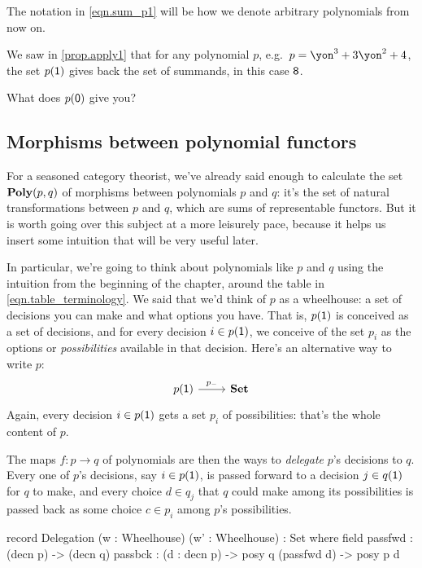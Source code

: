 \documentclass[DynamicalBook]{subfiles}
\begin{document}
The notation in \eqref{eqn.sum_p1} will be how we denote arbitrary polynomials from now on.

\begin{exercise}\label{exc.apply0}
We saw in \cref{prop.apply1} that for any polynomial $p$, e.g.\ $p=\yon^3+3\yon^2+4$, the set $p(\textsf{1})$ gives back the set of summands, in this case $\textsf{8}$. 

What does $p(\textsf{0})$ give you?
\end{exercise}

\subsection{Morphisms between polynomial functors}

For a seasoned category theorist, we've already said enough to calculate the set $\textbf{Poly}(p,q)$ of morphisms between polynomials $p$ and $q$: it's the set of natural transformations between $p$ and $q$, which are sums of representable functors. But it is worth going over this subject at a more leisurely pace, because it helps us insert some intuition that will be very useful later.

In particular, we're going to think about polynomials like $p$ and $q$ using the intuition from the beginning of the chapter, around the table in \eqref{eqn.table_terminology}. We said that we'd think of $p$ as a wheelhouse: a set of decisions you can make and what options you have. That is, $p(\textsf{1})$ is conceived as a set of decisions, and for every decision $i\in p(\textsf{1})$, we conceive of the set $p_i$ as the options or \emph{possibilities} available in that decision. Here's an alternative way to write $p$:
\[
\begin{tikzcd}
p(\1)\ar[r, "p_-"]&\smset
\end{tikzcd}
\]
Again, every decision $i\in p(\textsf{1})$ gets a set $p_i$ of possibilities: that's the whole content of $p$.

The maps $f\colon p\to q$ of polynomials are then the ways to \emph{delegate} $p$'s decisions to $q$. Every one of $p$'s decisions, say $i\in p(\textsf{1})$, is passed forward to a decision $j\in q(\textsf{1})$ for $q$ to make, and every choice $d\in q_j$ that $q$ could make among its possibilities is passed back as some choice $c\in p_i$ among $p$'s possibilities.

\begin{agda}
record Delegation (w : Wheelhouse) (w' : Wheelhouse) : Set where
   field 
     passfwd : (decn p) -> (decn q)
     passbck : (d : decn p) -> posy q (passfwd d) -> posy p d
\end{agda}
\end{document}
